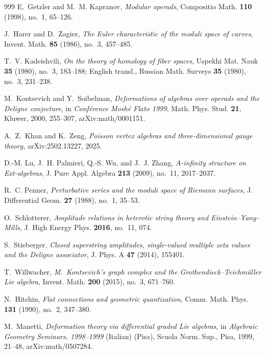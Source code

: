 \begin{thebibliography}{999}
E.~Getzler and M.~M. Kapranov, \emph{Modular operads}, Compositio Math. \textbf{110} (1998), no.~1, 65--126.

J.~Harer and D.~Zagier, \emph{The Euler characteristic of the moduli space of curves}, Invent. Math. \textbf{85} (1986), no.~3, 457--485.

T.~V. Kadeishvili, \emph{On the theory of homology of fiber spaces}, Uspekhi Mat. Nauk \textbf{35} (1980), no.~3, 183--188; English transl., Russian Math. Surveys \textbf{35} (1980), no.~3, 231--238.

M.~Kontsevich and Y.~Soibelman, \emph{Deformations of algebras over operads and the Deligne conjecture}, in \emph{Conf\'erence Mosh\'e Flato 1999}, Math. Phys. Stud. \textbf{21}, Kluwer, 2000, 255--307, arXiv:math/0001151.

A.~Z.~Khan and K.~Zeng, \emph{Poisson vertex algebras and three-dimensional gauge theory}, arXiv:2502.13227, 2025.

D.-M. Lu, J.~H. Palmieri, Q.-S. Wu, and J.~J. Zhang, \emph{$A$-infinity structure on Ext-algebras}, J. Pure Appl. Algebra \textbf{213} (2009), no.~11, 2017--2037.

R.~C. Penner, \emph{Perturbative series and the moduli space of Riemann surfaces}, J. Differential Geom. \textbf{27} (1988), no.~1, 35--53.

O.~Schlotterer, \emph{Amplitude relations in heterotic string theory and Einstein--Yang--Mills}, J. High Energy Phys. \textbf{2016}, no.~11, 074.

S.~Stieberger, \emph{Closed superstring amplitudes, single-valued multiple zeta values and the Deligne associator}, J. Phys. A \textbf{47} (2014), 155401.

T.~Willwacher, \emph{M.\ Kontsevich's graph complex and the Grothendieck--Teichm\"uller Lie algebra}, Invent. Math. \textbf{200} (2015), no.~3, 671--760.

N.~Hitchin, \emph{Flat connections and geometric quantization}, Comm. Math. Phys. \textbf{131} (1990), no.~2, 347--380.

M.~Manetti, \emph{Deformation theory via differential graded Lie algebras}, in \emph{Algebraic Geometry Seminars, 1998--1999} (Italian) (Pisa), Scuola Norm. Sup., Pisa, 1999, 21--48, arXiv:math/0507284.


\end{thebibliography}
